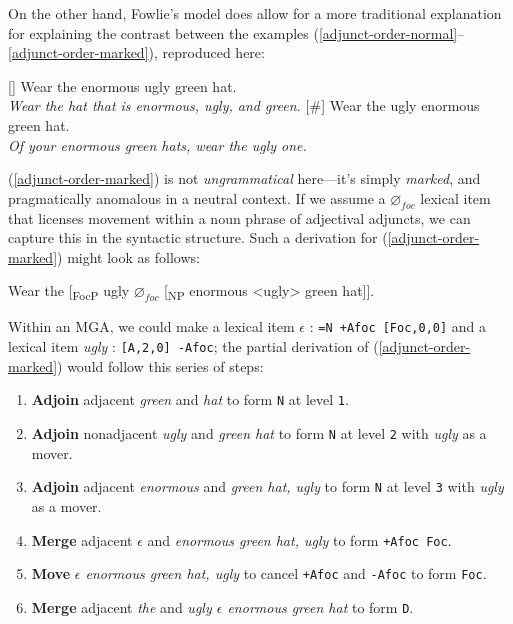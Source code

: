 \documentclass{article}
\begin{document}
On the other hand, Fowlie's model does allow for a more traditional
explanation for explaining the contrast between the examples
(\ref{adjunct-order-normal}--\ref{adjunct-order-marked}), reproduced
here:

\begin{exe}
  []{ Wear the enormous ugly green hat. \\
    \textit{Wear the hat that is enormous, ugly, and green.} }
  [\#]{ Wear the ugly enormous green hat. \\
    \textit{Of your enormous green hats, wear the ugly one.} }
\end{exe}

(\ref{adjunct-order-marked}) is not \emph{ungrammatical} here---it's
simply \emph{marked}, and pragmatically anomalous in a neutral
context.  If we assume a $\varnothing_{foc}$ lexical item that
licenses movement within a noun phrase of adjectival adjuncts, we can
capture this in the syntactic structure.  Such a derivation for
(\ref{adjunct-order-marked}) might look as follows:

\begin{exe}
  \ex Wear the [\textsubscript{FocP} ugly $\varnothing_{foc}$
  [\textsubscript{NP} enormous <ugly> green hat]].
\end{exe}

Within an MGA, we could make a lexical item $\epsilon$ : \texttt{=N
  +Afoc [Foc,0,0]} and a lexical item \textit{ugly} : \texttt{[A,2,0]
  -Afoc}; the partial derivation of (\ref{adjunct-order-marked}) would
follow this series of steps:

\begin{enumerate}
\setlength{\itemsep}{0pt}
\setlength{\parskip}{0pt}
\setlength{\parsep}{0pt}
\item \textbf{Adjoin} adjacent \textit{green} and \textit{hat} to form
  \texttt{N} at level \texttt{1}.
\item \textbf{Adjoin} nonadjacent \textit{ugly} and \textit{green hat}
  to form \texttt{N} at level \texttt{2} with \textit{ugly} as a
  mover.
\item \textbf{Adjoin} adjacent \textit{enormous} and \textit{green
    hat, ugly} to form \texttt{N} at level \texttt{3} with
  \textit{ugly} as a mover.
\item \textbf{Merge} adjacent $\epsilon$ and \textit{enormous green
    hat, ugly} to form \texttt{+Afoc Foc}.
\item \textbf{Move} \textit{$\epsilon$ enormous green hat, ugly} to
  cancel \texttt{+Afoc} and \texttt{-Afoc} to form \texttt{Foc}.
\item \textbf{Merge} adjacent \textit{the} and \textit{ugly $\epsilon$
    enormous green hat} to form \texttt{D}.
\end{enumerate}
\end{document}

